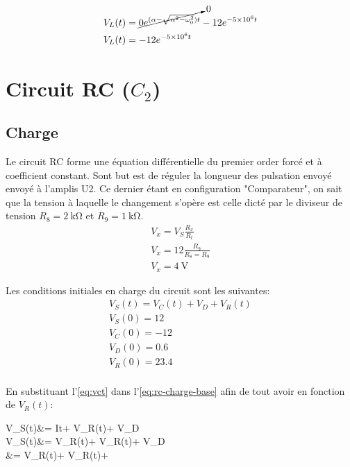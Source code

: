 \documentclass[a11paper, 11pt]{article}
\newcommand{\dt}{\mathrm{d}t}
\newcommand{\ddt}[1]{\frac{\text{d}^{#1}}{\text{d}t^{#1}}}
\newcommand{\vlt}{V_L(t)}
\newcommand{\vct}{V_C(t)}
\newcommand{\vrt}{V_R(t)}
\newcommand{\vst}{V_S(t)}
\newcommand{\al}{\alpha}
\newcommand{\ws}{\omega_{0}^2}
\renewcommand{\exp}[1]{\times10^{#1}}
\newcommand{\rootd}{\sqrt{\al^2-\ws}}
\begin{document}
\begin{appendix}
	\begin{gather*}
		\begin{align}
			\vlt & = \cancelto{0}{0e^{(\al-\rootd)t}} -12 e^{-5\exp{6}t} \\
			\vlt & = -12 e^{-5\exp{6}t}
		\end{align}
	\end{gather*}


	\newpage
	\section{Circuit RC (\texorpdfstring{$C_2$}{TEXT})}
	\subsection{Charge}
	Le circuit RC forme une équation différentielle du premier order forcé et à coefficient constant.
	Sont but est de réguler la longueur des pulsation envoyé envoyé à l'amplis U2.
	Ce dernier étant en configuration "Comparateur", on sait que la tension à laquelle le changement
	s'opère est celle dicté par le diviseur de tension $R_8 = \SI{2}{\kohm}$ et $R_9 = \SI{1}{\kohm}$.
	\begin{gather}
		V_x = V_S\frac{R_x}{R_t}\\
		V_x = 12\frac{R_9}{R_8 = R_9}\\
		V_x = \SI{4}{\V}
	\end{gather}

	Les conditions initiales en charge du circuit sont les suivantes:
	\begin{gather}
		\vst = \vct + V_D + \vrt \label{eq:rc-charge-base}\\
		V_S(0) = 12\\
		V_C(0) = -12\\
		V_D(0) = 0.6\\
		V_R(0) = 23.4 \label{eq:rc-charge-init}\\
	\end{gather}

	En substituant l'\cref{eq:vct} dans l'\cref{eq:rc-charge-base} afin de tout
	avoir en fonction de $\vrt$:
	\begin{DispWithArrows}[rr,xoffset=0.4cm]
		\vst &= \int I\dt + \vrt + V_D
		 \\
		\vst &= \int\vrt + \vrt + V_D
		\\
		\cancelto{0}{\ddt{}\vst} &= \vrt + \ddt{}\vrt + \label{eq:rc-charge-deriv}
	\end{DispWithArrows}


\end{appendix}
\end{document}
